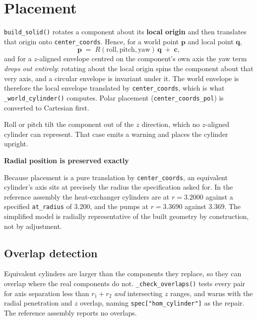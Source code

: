 \documentclass[9pt,a4paper]{extarticle}
\newcommand{\code}[1]{\texttt{\small #1}}
\newenvironment{caveat}[1]%
  {\par\medskip\noindent
   \begin{lrbox}{\caveatbox}%
   \begin{minipage}{\dimexpr\linewidth-2\fboxsep-2\fboxrule\relax}%
   \textbf{#1}\par\medskip}%
  {\end{minipage}%
   \end{lrbox}%
   \fcolorbox{warnrule}{warnbg}{\usebox{\caveatbox}}\par\medskip}
\begin{document}
\section{Placement}

\code{build\_solid()} rotates a component about its \textbf{local origin} and
then translates that origin onto \code{center\_coords}. Hence, for a world point
$\mathbf{p}$ and local point $\mathbf{q}$,
\[
\mathbf{p} \;=\; R(\text{roll},\text{pitch},\text{yaw})\,\mathbf{q}
              \;+\; \mathbf{c},
\]
and for a $z$-aligned envelope centred on the component's own axis the yaw term
\emph{drops out entirely}: rotating about the local origin spins the component
about that very axis, and a circular envelope is invariant under it. The world
envelope is therefore the local envelope translated by \code{center\_coords},
which is what \code{\_world\_cylinder()} computes. Polar placement
(\code{center\_coords\_pol}) is converted to Cartesian first.

Roll or pitch tilt the component out of the $z$ direction, which no $z$-aligned
cylinder can represent. That case emits a warning and places the cylinder
upright.

\begin{caveat}{Radial position is preserved exactly}
Because placement is a pure translation by \code{center\_coords}, an equivalent
cylinder's axis sits at precisely the radius the specification asked for. In the
reference assembly the heat-exchanger cylinders are at $r=3.2000$ against a
specified \code{at\_radius} of $3.200$, and the pumps at $r=3.3690$ against
$3.369$. The simplified model is radially representative of the built geometry
by construction, not by adjustment.
\end{caveat}

\subsection{Overlap detection}

Equivalent cylinders are larger than the components they replace, so they can
overlap where the real components do not. \code{\_check\_overlaps()} tests every
pair for axis separation less than $r_1+r_2$ \emph{and} intersecting $z$ ranges,
and warns with the radial penetration and $z$ overlap, naming
\code{spec["hom\_cylinder"]} as the repair. The reference assembly reports no
overlaps.
\end{document}
